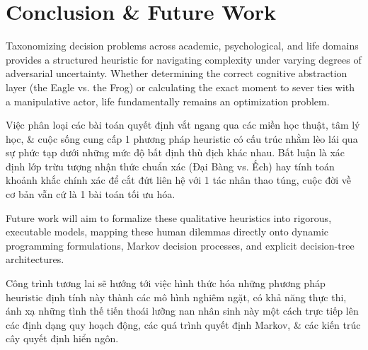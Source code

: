 \documentclass{article}
\begin{document}
\section{Conclusion \& Future Work}

Taxonomizing decision problems across academic, psychological, and life domains provides a structured heuristic for navigating complexity under varying degrees of adversarial uncertainty. Whether determining the correct cognitive abstraction layer (the Eagle vs. the Frog) or calculating the exact moment to sever ties with a manipulative actor, life fundamentally remains an optimization problem. 

Việc phân loại các bài toán quyết định vắt ngang qua các miền học thuật, tâm lý học, \& cuộc sống cung cấp 1 phương pháp heuristic có cấu trúc nhằm lèo lái qua sự phức tạp dưới những mức độ bất định thù địch khác nhau. Bất luận là xác định lớp trừu tượng nhận thức chuẩn xác (Đại Bàng vs. Ếch) hay tính toán khoảnh khắc chính xác để cắt đứt liên hệ với 1 tác nhân thao túng, cuộc đời về cơ bản vẫn cứ là 1 bài toán tối ưu hóa.

Future work will aim to formalize these qualitative heuristics into rigorous, executable models, mapping these human dilemmas directly onto dynamic programming formulations, Markov decision processes, and explicit decision-tree architectures.

Công trình tương lai sẽ hướng tới việc hình thức hóa những phương pháp heuristic định tính này thành các mô hình nghiêm ngặt, có khả năng thực thi, ánh xạ những tình thế tiến thoái lưỡng nan nhân sinh này một cách trực tiếp lên các định dạng quy hoạch động, các quá trình quyết định Markov, \& các kiến trúc cây quyết định hiển ngôn.

\printbibliography[heading=bibintoc]
\end{document}
